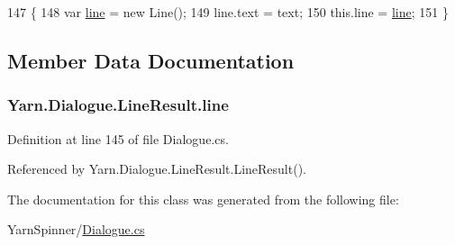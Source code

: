 \begin{DoxyCode}
147                                             \{
148                 var \hyperlink{a00134_abfbb0ea840b02acd0ecdc72c5b120257}{line} = \textcolor{keyword}{new} Line();
149                 line.text = text;
150                 this.line = \hyperlink{a00134_abfbb0ea840b02acd0ecdc72c5b120257}{line};
151             \}
\end{DoxyCode}


\subsection{Member Data Documentation}
\hypertarget{a00134_abfbb0ea840b02acd0ecdc72c5b120257}{
\subsubsection[{line}]{ Yarn.\-Dialogue.\-Line\-Result.\-line}}\label{a00134_abfbb0ea840b02acd0ecdc72c5b120257}


Definition at line 145 of file Dialogue.\-cs.



Referenced by Yarn.\-Dialogue.\-Line\-Result.\-Line\-Result().



The documentation for this class was generated from the following file\-:\begin{DoxyCompactItemize}
\item 
Yarn\-Spinner/\hyperlink{a00308}{Dialogue.\-cs}\end{DoxyCompactItemize}
